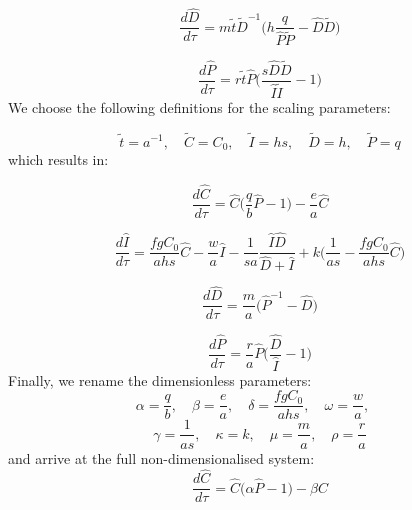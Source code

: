 \documentclass[12pt]{article}
\begin{document}
\begin{equation}
  \frac{d\hat{D}}{d\tau} = m \tilde{t} \tilde{D}^{-1} \Big( h \frac{q}{\hat{P}\tilde{P}} - \hat{D}\tilde{D}\Big)
\end{equation}

\begin{equation}
  \frac{d\hat{P}}{d\tau} = r \tilde{t} \hat{P}\Big(\frac{s\hat{D}\tilde{D}}{\hat{I}\tilde{I}} - 1\Big)
\end{equation}
%
We choose the following definitions for the scaling parameters:

\begin{equation}
  \tilde{t} = a^{-1}, \quad \tilde{C} = C_{0}, \quad \tilde{I} = hs , \quad \tilde{D} = h, \quad \tilde{P} = q
\end{equation}
%
which results in:

\begin{equation}
  \frac{d\hat{C}}{d \tau} = \hat{C} \Big(\frac{q}{b}\hat{P} - 1\Big) - \frac{e}{a} \hat{C}
\end{equation}

\begin{equation}
  \frac{d\hat{I}}{d\tau} = \frac{f g C_{0}}{ahs} \hat{C} - \frac{w}{a} \hat{I} - \frac{1}{sa} \frac{\hat{I}\hat{D}}{\hat{D} + \hat{I}} + k \Big(\frac{1}{as} - \frac{f g C_0}{ahs} \hat{C}\Big)
\end{equation}

\begin{equation}
  \frac{d\hat{D}}{d\tau } = \frac{m}{a} \Big( \hat{P}^{-1} - \hat{D}\Big)
\end{equation}

\begin{equation}
  \frac{d\hat{P}}{d\tau} = \frac{r}{a} \hat{P}\Big(\frac{\hat{D}}{\hat{I}} - 1\Big)
\end{equation}
%
Finally, we rename the dimensionless parameters:
%
\begin{equation}
  \alpha = \frac{q}{b}, \quad
  \beta = \frac{e}{a}, \quad
  \delta = \frac{f g C_{0}}{ahs}, \quad
  \omega = \frac{w}{a}, \quad
\end{equation}
\begin{equation}
  \gamma = \frac{1}{as}, \quad
  \kappa = k, \quad
  \mu = \frac{m}{a}, \quad
  \rho = \frac{r}{a}
\end{equation}
%
and arrive at the full non-dimensionalised system:
\begin{equation}
  \frac{d\hat{C}}{d \tau} = \hat{C} \Big(\alpha \hat{P} - 1\Big) - \beta \hat{C}
\end{equation}
\end{document}
